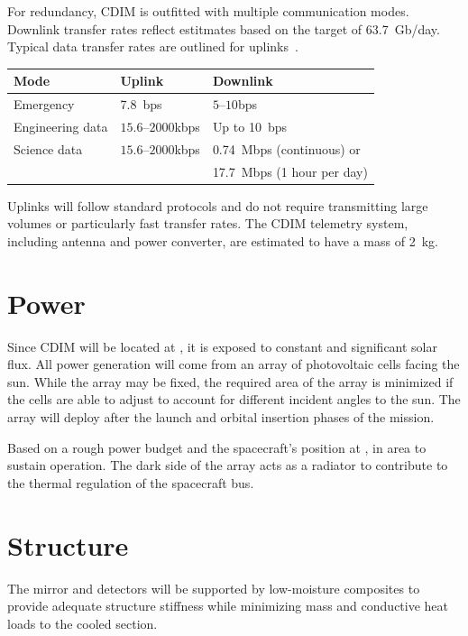 \documentclass{ws-jai}
\begin{document}
\begin{wstable}[htb]
  \caption{For redundancy, CDIM is outfitted with multiple communication modes.
  Downlink transfer rates reflect estitmates based on the target of \SI{63.7}{Gb/day}.
  Typical data transfer rates are outlined for uplinks~\cite{smad2015}.
\label{tab:telemetry}}
  \begin{tabular}{@{}lll@{}} \toprule
    Mode & Uplink & Downlink \\ \midrule
    Emergency & \SI{7.8}{bps} & $5$--$10$\si{bps} \\
    Engineering data & $15.6$--$2000$\si{kbps} & Up to \SI{10}{bps} \\
    Science data & $15.6$--$2000$\si{kbps} & \SI{0.74}{Mbps} (continuous) or \\
    & & \SI{17.7}{Mbps} (1 hour per day)\\\bottomrule
  \end{tabular}
\end{wstable}

Uplinks will follow standard protocols and do not require transmitting large volumes or particularly fast transfer rates.
The CDIM telemetry system, including antenna and power converter, are estimated to have a mass of \SI{2}{kg}.

\section{Power}
\label{sec:power}
Since CDIM will be located at \Ltwo, it is exposed to constant and significant solar flux.
All power generation will come from an array of photovoltaic cells facing the sun.
While the array may be fixed, the required area of the array is minimized if the cells are able to adjust to account for different incident angles to the sun.
The array will deploy after the launch and orbital insertion phases of the mission.

Based on a rough power budget and the spacecraft's position at \Ltwo,  in area to sustain operation.
The dark side of the array acts as a radiator to contribute to the thermal regulation of the spacecraft bus.


\section{Structure}
\label{sec:structure}
The mirror and detectors will be supported by low-moisture composites to provide adequate structure stiffness while minimizing mass and conductive heat loads to the cooled section.
\end{document}
